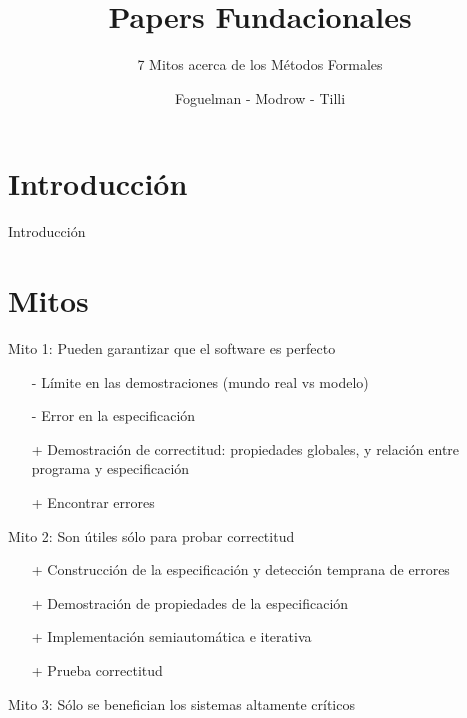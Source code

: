 \documentclass{beamer}
\title{Papers Fundacionales}
\subtitle{7 Mitos acerca de los M\'etodos Formales}
\author{Foguelman - Modrow - Tilli}
\institute{DC - UBA}
\begin{document}
\frame{\titlepage}
\section{Introducci\'on}
\begin{frame}{Introducci\'on}

\end{frame}

\section{Mitos}
\begin{frame}{Mito 1: Pueden garantizar que el software es perfecto }
\begin{itemize}[<+->]
\item[-] L\'imite en las demostraciones (mundo real vs modelo)
\item[-] Error en la especificaci\'on
\item[+] Demostraci\'on de correctitud: propiedades globales, y relaci\'on entre programa y especificaci\'on
\item[+] Encontrar errores
\end{itemize}
\end{frame}

\begin{frame}{Mito 2: Son \'utiles s\'olo para probar correctitud}
\begin{itemize}[<+->]
\item[+] Construcci\'on de la especificaci\'on y detecci\'on temprana de errores
\item[+] Demostraci\'on de propiedades de la especificaci\'on
\item[+] Implementaci\'on semiautom\'atica e iterativa
\item[+] Prueba correctitud
\end{itemize}
\end{frame}
 
\begin{frame}{Mito 3: S\'olo se benefician los sistemas altamente cr\'iticos}
 
\end{frame}
 
\end{document}
